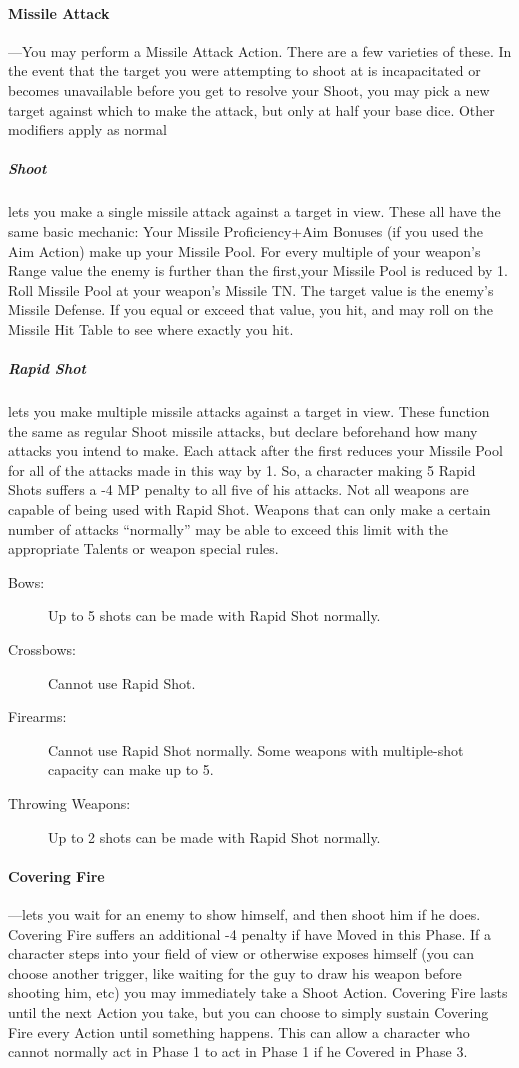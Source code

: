 \documentclass[oneside,11pt,english]{book}
\begin{document}
\paragraph{Missile Attack}\label{sec:missile-attack}
---\quad You may perform a Missile Attack Action. There are a few varieties of these. In the event
that the target you were attempting to shoot at is incapacitated or becomes unavailable before you get to
resolve your Shoot, you may pick a new target against which to make the attack, but only at half your
base dice. Other modifiers apply as normal
\subparagraph{Shoot} lets you make a single missile attack against a target in view. These all have the same basic mechanic: Your Missile Proficiency+Aim Bonuses (if you used the Aim Action) make up your Missile Pool. For every multiple of your weapon’s Range value the enemy is further than the first,your Missile Pool is reduced by 1.
Roll Missile Pool at your weapon’s Missile TN. The target value is the enemy’s Missile Defense.
If you equal or exceed that value, you hit, and may roll on the Missile Hit Table to see where
exactly you hit.
\subparagraph{Rapid Shot} lets you make multiple missile attacks against a target in view. These function the
same as regular Shoot missile attacks, but declare beforehand how many attacks you intend to
make. Each attack after the first reduces your Missile Pool for all of the attacks made in this way by 1. So, a character making 5 Rapid Shots suffers a -4 MP penalty to all five of his attacks. Not
all weapons are capable of being used with Rapid Shot. Weapons that can only make a certain
number of attacks “normally” may be able to exceed this limit with the appropriate Talents or
weapon special rules.
\begin{description}
	\item [Bows:] Up to 5 shots can be made with Rapid Shot normally.
	\item	[Crossbows:] Cannot use Rapid Shot.
	\item	[Firearms:] Cannot use Rapid Shot normally. Some weapons with multiple-shot capacity can make up to 5.
	\item 	[Throwing Weapons:] Up to 2 shots can be made with Rapid Shot normally.
\end{description}

\paragraph{\label{par:Covering Fire} Covering Fire}---\quad lets you wait for an enemy to show himself, and then shoot him if he does.
Covering Fire suffers an additional -4 penalty if have Moved in this Phase. If a character steps
into your field of view or otherwise exposes himself (you can choose another trigger, like waiting
for the guy to draw his weapon before shooting him, etc) you may immediately take a Shoot
Action. Covering Fire lasts until the next Action you take, but you can choose to simply sustain
Covering Fire every Action until something happens. This can allow a character who cannot
normally act in Phase 1 to act in Phase 1 if he Covered in Phase 3.
\end{document}
